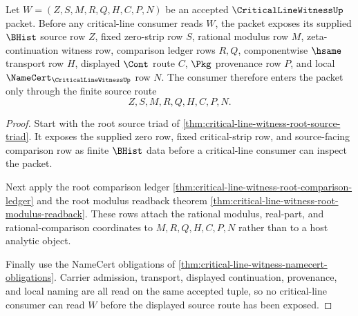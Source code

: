 \begin{theorem}
\label{thm:critical-line-witness-source-route-totality}
Let $W=(Z,S,M,R,Q,H,C,P,N)$ be an accepted $\CriticalLineWitnessUp$ packet.
Before any critical-line consumer reads $W$, the packet exposes its supplied
$\BHist$ source row $Z$, fixed zero-strip row $S$, rational modulus row $M$,
zeta-continuation witness row, comparison ledger rows $R,Q$, componentwise
$\hsame$ transport row $H$, displayed $\Cont$ route $C$, $\Pkg$ provenance row
$P$, and local $\NameCert_{\CriticalLineWitnessUp}$ row $N$. The consumer
therefore enters the packet only through the finite source route
$$
Z,S,M,R,Q,H,C,P,N.
$$
\end{theorem}
\begin{proof}
Start with the root source triad of
\autoref{thm:critical-line-witness-root-source-triad}. It exposes the supplied
zero row, fixed critical-strip row, and source-facing comparison row as finite
$\BHist$ data before a critical-line consumer can inspect the packet.

Next apply the root comparison ledger
\autoref{thm:critical-line-witness-root-comparison-ledger} and the root modulus
readback theorem \autoref{thm:critical-line-witness-root-modulus-readback}.
These rows attach the rational modulus, real-part, and rational-comparison
coordinates to $M,R,Q,H,C,P,N$ rather than to a host analytic object.

Finally use the NameCert obligations of
\autoref{thm:critical-line-witness-namecert-obligations}. Carrier admission,
transport, displayed continuation, provenance, and local naming are all read
on the same accepted tuple, so no critical-line consumer can read $W$ before
the displayed source route has been exposed.
\end{proof}

